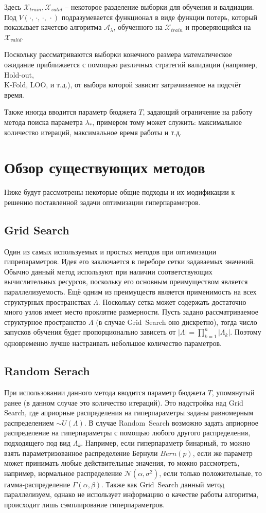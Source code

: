 \documentclass[12pt,fleqn]{article}
\begin{document}
Здесь $\mathcal{X}_{train}, \mathcal{X}_{valid}$ -- некоторое разделение выборки для обучения и валдиации. Под $V(\cdot,\, \cdot,\, \cdot,\, \cdot)$ подразумевается функционал в виде функции потерь, который показывает качетсво алгоритма $\mathcal{A}_{\lambda}$, обученного на $\mathcal{X}_{train}$ и проверяющийся на $\mathcal{X}_{valid}$.

Поскольку рассматриваются выборки конечного размера математическое ожидание приближается с помощью различных стратегий валидации (например, Hold-out,\\ K-Fold, LOO, и т.д.), от выбора которой зависит затрачиваемое на подсчёт время.

Также иногда вводится параметр бюджета $T$, задающий ограничение на работу метода поиска параметра $\lambda_{*}$, примером тому может служить: максимальное количество итераций, максимальное время работы и т.д.

\section{Обзор существующих методов}
Ниже будут рассмотрены некоторые общие подходы и их модификации к решению поставленной задачи оптимизации гиперпараметров.

\subsection{Grid Search}
Один из самых используемых и простых методов при оптимизации гипрепараметров. Идея его заключается в переборе сетки задаваемых значений. Обычно данный метод используют при наличии соответствующих вычислительных ресурсов, поскольку его основным преимуществом является параллелизуемость. Ещё одним из преимуществ является применимость на всех структурных пространствах $\Lambda$. Поскольку сетка может содержать достаточно много узлов имеет место проклятие размерности. Пусть задано рассматриваемое структурное пространство $\Lambda$ (в случае Grid~Search оно дискретно), тогда число запусков обучения будет пропорционально зависеть от $|\Lambda| = \prod_{k=1}^{n}|\Lambda_k|$. Поэтому одновременно лучше настраивать небольшое количество параметров.
\subsection{Random Serach}
При использовании данного метода вводится параметр бюджета $T$, упомянутый ранее (в данном случае это количество итераций). Это надстройка над Grid Search, где априорные распределения на гиперпараметры заданы равномерным распределением $\sim U(\Lambda)$. В случае Random~Search возможно задать априорное распределение на гиперпараметры с помощью любого другого распределения, подходящего под вид $\Lambda_k$. Например, если гиперпараметр бинарный, то можно взять параметризованное распределение Бернули $Bern({p})$, если же параметр может принимать любые действительные значения, то можно рассмотреть, например, нормальное распределение $\mathcal{N}(\alpha, \sigma^2)$, если только положительные, то гамма-распределение $\Gamma(\alpha, \beta)$. Также как Grid~Search данный метод параллелизуем, однако не использует информацию о качестве работы алгоритма, происходит лишь сэмплирование гиперпараметров.
\end{document}
